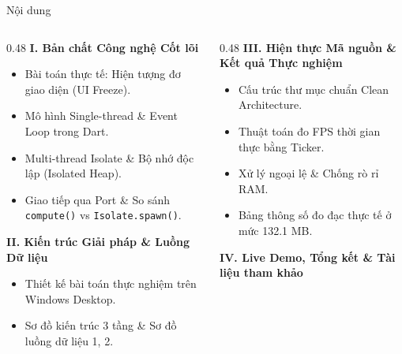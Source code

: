 \documentclass[aspectratio=169, 10pt]{beamer}
\begin{document}
\begin{frame}{Nội dung}
  \begin{columns}[t]
    \begin{column}{0.48\textwidth}
      \textbf{I. Bản chất Công nghệ Cốt lõi}
      \begin{itemize}
        \item Bài toán thực tế: Hiện tượng đơ giao diện (UI Freeze).
        \item Mô hình Single-thread \& Event Loop trong Dart.
        \item Multi-thread Isolate \& Bộ nhớ độc lập (Isolated Heap).
        \item Giao tiếp qua Port \& So sánh \texttt{compute()} vs \texttt{Isolate.spawn()}.
      \end{itemize}
      \vspace{0.3cm}
      \textbf{II. Kiến trúc Giải pháp \& Luồng Dữ liệu}
      \begin{itemize}
        \item Thiết kế bài toán thực nghiệm trên Windows Desktop.
        \item Sơ đồ kiến trúc 3 tầng \& Sơ đồ luồng dữ liệu 1, 2.
      \end{itemize}
    \end{column}

    \begin{column}{0.48\textwidth}
      \textbf{III. Hiện thực Mã nguồn \& Kết quả Thực nghiệm}
      \begin{itemize}
        \item Cấu trúc thư mục chuẩn Clean Architecture.
        \item Thuật toán đo FPS thời gian thực bằng Ticker.
        \item Xử lý ngoại lệ \& Chống rò rỉ RAM.
        \item Bảng thông số đo đạc thực tế ở mức 132.1 MB.
      \end{itemize}
      \vspace{0.3cm}
      \textbf{IV. Live Demo, Tổng kết \& Tài liệu tham khảo}
    \end{column}
  \end{columns}
\end{frame}
\end{document}
